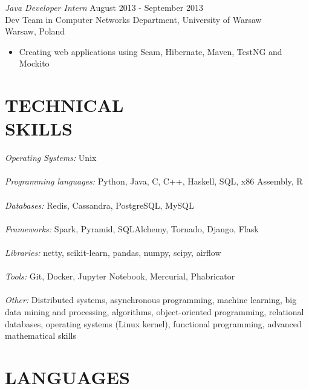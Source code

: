 \documentclass[margin, 10pt]{res} %
\begin{document}
\begin{resume}
{\sl Java Developer Intern } \hfill August 2013 - September 2013 \\
Dev Team in Computer Networks Department, University of Warsaw \\
Warsaw, Poland
\begin{itemize} 
\item Creating web applications using Seam, Hibernate, Maven, TestNG and Mockito
\end{itemize}


\section{TECHNICAL \\ SKILLS} 

{\sl Operating Systems:} Unix \\ \\
{\sl Programming languages:}
Python, Java, C, C++, Haskell, SQL, x86 Assembly, R \\ \\
{\sl Databases:} Redis, Cassandra, PostgreSQL, MySQL \\ \\
{\sl Frameworks:} Spark, Pyramid, SQLAlchemy, Tornado, Django, Flask \\ \\
{\sl Libraries:} netty, scikit-learn, pandas, numpy, scipy, airflow \\ \\
{\sl Tools:} Git, Docker, Jupyter Notebook, Mercurial, Phabricator \\ \\
{\sl Other:} Distributed systems, asynchronous programming, machine learning, big data mining and processing, algorithms, object-oriented programming, relational databases, operating systems (Linux kernel), functional programming, advanced mathematical skills


\section{ LANGUAGES } 


\end{resume}
\end{document}
